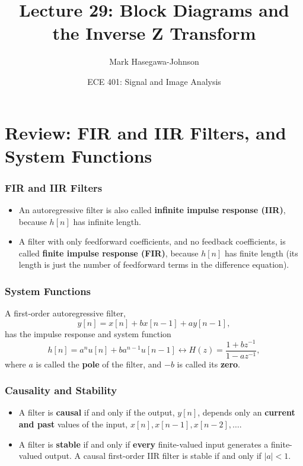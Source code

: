 \documentclass{beamer}
\title{Lecture 29: Block Diagrams and the Inverse Z Transform}
\author{Mark Hasegawa-Johnson}
\date{ECE 401: Signal and Image Analysis}
\begin{document}
\begin{frame}
  \maketitle
\end{frame}

\begin{frame}
  \tableofcontents
\end{frame}

\section[Review]{Review: FIR and IIR Filters, and System Functions}
\setcounter{subsection}{1}

\begin{frame}
  \frametitle{FIR and IIR Filters}
  \begin{itemize}
  \item An autoregressive filter is also called {\bf infinite impulse response (IIR)},
    because $h[n]$ has infinite length.
  \item A filter with only feedforward coefficients, and no feedback coefficients, is called
    {\bf finite impulse response (FIR)}, because $h[n]$ has finite length (its length is
    just the number of feedforward terms in the difference equation).
  \end{itemize}
\end{frame}

\begin{frame}
  \frametitle{System Functions}
  A first-order autoregressive filter,
  \[
  y[n] = x[n]+bx[n-1]+ay[n-1],
  \]
  has the impulse response and system function
  \[
  h[n]=a^n u[n]+ba^{n-1}u[n-1] \leftrightarrow H(z)  = \frac{1+bz^{-1}}{1-az^{-1}},
  \]
  where $a$ is called the {\bf pole} of the filter, and $-b$ is called
  its {\bf zero}.
\end{frame}

\begin{frame}
  \frametitle{Causality and Stability}
  \begin{itemize}
  \item A filter is {\bf causal} if and only if the output, $y[n]$,
    depends only an {\bf current and past} values of the input, $x[n],
    x[n-1],x[n-2],\ldots$.
  \item A filter is {\bf stable} if and only if {\bf every}
    finite-valued input generates a finite-valued output.  A causal
    first-order IIR filter is stable if and only if $|a|<1$.
  \end{itemize}
\end{frame}
\end{document}
